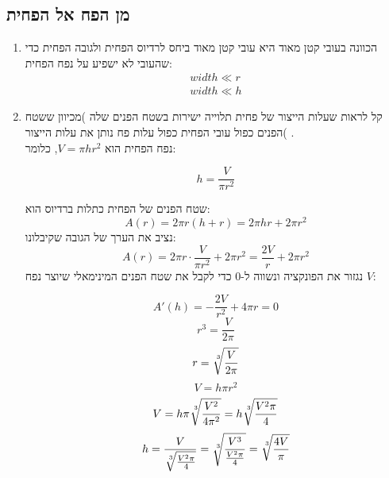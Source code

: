 \documentclass{article}
\begin{document}
\subsection*{מן הפח אל הפחית}
\begin{enumerate}
  \item הכוונה בעובי קטן מאוד היא עובי קטן מאוד ביחס לרדיוס הפחית ולגובה הפחית כדי שהעובי לא ישפיע על נפח הפחית:
  \begin{align*}
      width \ll r \\
      width \ll h
  \end{align*}
    



  \item קל לראות שעלות הייצור של פחית תלוייה ישירות בשטח הפנים שלה )מכיוון ששטח הפנים כפול עובי הפחית כפול עלות פח נותן את עלות הייצור( .\\
  נפח הפחית הוא $V = \pi h r^2$,
  כלומר:

  \begin{equation*}
      h = \frac{V}{\pi r^2}
  \end{equation*}

  שטח הפנים של הפחית כתלות ברדיוס הוא: 
  \begin{equation*}
      A(r) =  2\pi r\left( h+r \right) = 2\pi hr + 2\pi r^2
  \end{equation*}
  נציב את הערך של הגובה שקיבלונו:
    \begin{equation*}
      A(r) =  2\pi r \cdot \frac{V}{\pi r^2} + 2\pi r^2 = \frac{2V}{r} +2\pi r^2
    \end{equation*}
  נגזור את הפונקציה ונשווה ל-0 כדי לקבל את שטח הפנים המינימאלי שיוצר נפח $V$:

  \begin{equation*}
    A'(h) = -\frac{2V}{r^2} + 4\pi r = 0
  \end{equation*}
  \begin{equation*}
      r^3 = \frac{V}{2\pi}
  \end{equation*}
  \begin{equation*}
      r = \sqrt[\leftroot{-2}\uproot{2}3]{\frac{V}{2\pi}}
  \end{equation*}
    \begin{equation*}
      V = h\pi r^2
  \end{equation*}
  \begin{equation*}
      V = h\pi\sqrt[\leftroot{-2}\uproot{2}3]{\frac{V^2}{4\pi^2}} = h\sqrt[\leftroot{-2}\uproot{2}3]{\frac{V^2\pi}{4}}
  \end{equation*}
    \begin{equation*}
        h = \frac{V}{\sqrt[\leftroot{-2}\uproot{2}3]{\frac{V^2\pi}{4}}}
        = \sqrt[\leftroot{-2}\uproot{2}3]{\frac{V^3}{\frac{V^2\pi}{4}}}
        = \sqrt[\leftroot{-2}\uproot{2}3]{\frac{4V}{\pi}}
    \end{equation*}


\end{enumerate}
\end{document}
